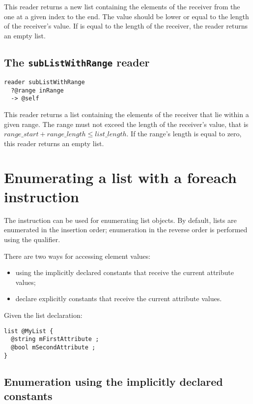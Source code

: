 This reader returns a new list containing the elements of the receiver from the one at a given index to the end. The   value should be lower or equal to the length of the receiver's value. If  is equal to the length of the receiver, the reader returns an empty list.


\subsection{The \texttt{subListWithRange} reader}

\begin{lstlisting}[language=galgas]
reader subListWithRange
  ?@range inRange
  -> @self
\end{lstlisting}

This reader returns a list containing the elements of the receiver that lie within a given range. The range must not exceed the length of the receiver's value, that is $range\_start + range\_length \leqslant list\_length$. If the range's length is equal to zero, this reader returns an empty list.





\section{Enumerating a list with a foreach instruction}

The  instruction can be used for enumerating list objects. By default, lists are enumerated in the insertion order; enumeration in the reverse order is performed using the \galgas{>} qualifier.

There are two ways for accessing element values:
\begin{itemize}
\item using the implicitly declared constants that receive the current attribute values;
\item declare explicitly constants that receive the current attribute values.
\end{itemize}

Given the list declaration:

\begin{lstlisting}[language=galgas]
list @MyList {
  @string mFirstAttribute ;
  @bool mSecondAttribute ;
}
\end{lstlisting}

\subsection{Enumeration using the implicitly declared constants}

